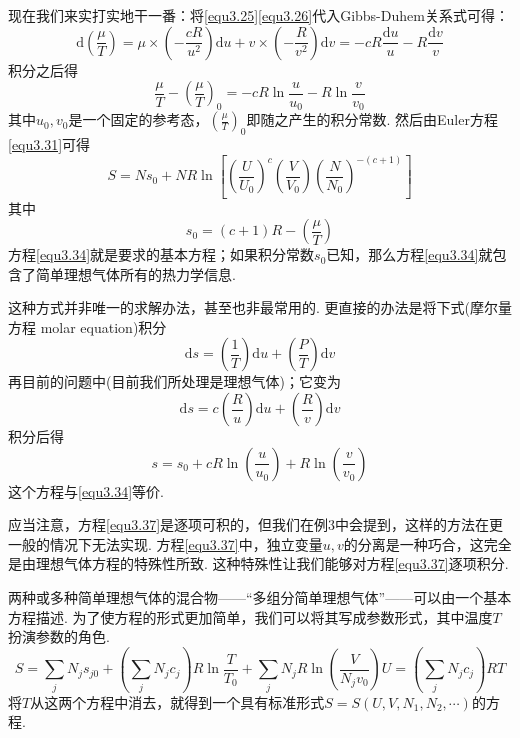 现在我们来实打实地干一番：将\eqref{equ3.25}\eqref{equ3.26}代入Gibbs-Duhem关系式可得：
\begin{equation}
\label{equ3.32}
\text{d}(\frac{\mu}{T})=\mu\times(-\frac{cR}{u^2})\text{d}u+v\times(-\frac{R}{v^2})\text{d}v=-cR\frac{\text{d}u}{u}-R\frac{\text{d}v}{v}
\end{equation}
积分之后得
\begin{equation}
\label{equ3.33}
\frac{\mu}{T}-(\frac{\mu}{T})_0=-cR\ln{\frac{u}{u_0}}-R\ln{\frac{v}{v_0}}
\end{equation}
其中$u_0,v_0$是一个固定的参考态，$(\frac{\mu}{T})_0$即随之产生的积分常数. 然后由Euler方程\eqref{equ3.31}可得
\begin{equation}
\label{equ3.34}
S=Ns_0+NR\ln\left[\left(\frac{U}{U_0}\right)^c\left(\frac{V}{V_0}\right)\left(\frac{N}{N_0}\right)^{-(c+1)}\right]
\end{equation}
其中
\begin{equation}
\label{equ3.35}
s_0=(c+1)R-\left(\frac{\mu}{T}\right)
\end{equation}
方程\eqref{equ3.34}就是要求的基本方程；如果积分常数$s_0$已知，那么方程\eqref{equ3.34}就包含了简单理想气体所有的热力学信息.

这种方式并非唯一的求解办法，甚至也非最常用的. 更直接的办法是将下式(摩尔量方程 molar equation)积分
\begin{equation}
\label{equ3.36}
\text{d}s=(\frac{1}{T})\text{d}u+(\frac{P}{T})\text{d}v
\end{equation}
再目前的问题中(目前我们所处理是理想气体)；它变为
\begin{equation}
\label{equ3.37}
\text{d}s=c(\frac{R}{u})\text{d}u+(\frac{R}{v})\text{d}v
\end{equation}
积分后得
\begin{equation}
\label{equ3.38}
s=s_0+cR\ln(\frac{u}{u_0})+R\ln(\frac{v}{v_0})
\end{equation}
这个方程与\eqref{equ3.34}等价.

应当注意，方程\eqref{equ3.37}是逐项可积的，但我们在例3中会提到，这样的方法在更一般的情况下无法实现. 方程\eqref{equ3.37}中，独立变量$u,v$的分离是一种巧合，这完全是由理想气体方程的特殊性所致. 这种特殊性让我们能够对方程\eqref{equ3.37}逐项积分.

两种或多种简单理想气体的混合物——“多组分简单理想气体”——可以由一个基本方程描述. 为了使方程的形式更加简单，我们可以将其写成参数形式，其中温度$T$扮演参数的角色.
\begin{equation}
\label{equ3.39}
S=\sum_j N_js_{j0}+\left(\sum_j N_jc_j\right)R\ln\frac{T}{T_0}+\sum_j N_jR\ln\left(\frac{V}{N_jv_0}\right)
U=\left(\sum_jN_jc_j\right)RT
\end{equation}
将$T$从这两个方程中消去，就得到一个具有标准形式$S=S(U,V,N_1,N_2,\cdots)$的方程.

